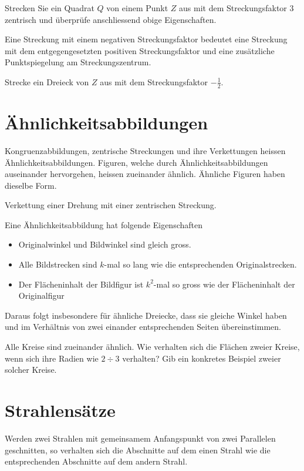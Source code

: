 \documentclass[%
11pt,%
twoside,%
titlepage,%
a4page,%
headsepline%
]{scrartcl}
\begin{document}
\begin{ueb}
Strecken Sie ein Quadrat $Q$ von einem Punkt $Z$ aus mit dem Streckungsfaktor $3$ zentrisch und \"uberpr\"ufe anschliessend obige Eigenschaften.%
\end{ueb}

\begin{ueb}
Eine Streckung mit einem negativen Streckungsfaktor bedeutet eine Streckung mit dem entgegengesetzten positiven Streckungsfaktor und eine zus\"atzliche Punktspiegelung am Streckungszentrum.

\noindent Strecke ein Dreieck von $Z$ aus mit dem Streckungsfaktor $-\frac{1}{2}$.
\end{ueb}

\section{\"Ahnlichkeitsabbildungen}
Kongruenzabbildungen, zentrische Streckungen und ihre Verkettungen heissen \"Ahnlichkeitsabbildungen. Figuren, welche durch \"Ahnlichkeitsabbildungen auseinander hervorgehen, heissen zueinander \"ahnlich. \"Ahnliche Figuren haben dieselbe Form.

\begin{bsp}
Verkettung einer Drehung mit einer zentrischen Streckung.%
\end{bsp}

Eine \"Ahnlichkeitsabbildung hat folgende Eigenschaften
\begin{itemize}
\item Originalwinkel und Bildwinkel sind gleich gross.
\item Alle Bildstrecken sind $k$-mal so lang wie die entsprechenden Originalstrecken.
\item Der Fl\"acheninhalt der Bildfigur ist $k^2$-mal so gross wie der Fl\"acheninhalt der Originalfigur
\end{itemize}
Daraus folgt insbesondere f\"ur \"ahnliche Dreiecke, dass sie gleiche Winkel haben und im Verh\"altnis von zwei einander entsprechenden Seiten \"ubereinstimmen.

\begin{ueb}
Alle Kreise sind zueinander \"ahnlich. Wie verhalten sich die Fl\"achen zweier Kreise, wenn sich ihre Radien wie $2\div3$ verhalten? Gib ein konkretes Beispiel zweier solcher Kreise.
\end{ueb}

\section{Strahlens\"atze}
\begin{satz}[1. Strahlensatz]
Werden zwei Strahlen mit gemeinsamem Anfangspunkt von zwei Parallelen geschnitten, so verhalten sich die Abschnitte auf dem einen Strahl wie die entsprechenden Abschnitte auf dem andern Strahl.%
\end{satz}
\end{document}
